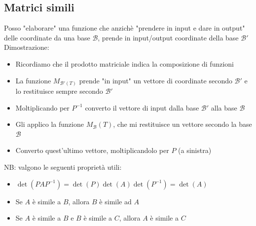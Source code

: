 \documentclass[12pt,a4paper,oneside]{article}
\begin{document}
\subsection{Matrici simili}
Posso "elaborare" una funzione che anzichè "prendere in input e dare in output" delle coordinate da una base $ \mathcal{B} $, prende in input/output coordinate della base $ \mathcal{B}' $
Dimostrazione:
\begin{itemize}
	\item Ricordiamo che il prodotto matriciale indica la composizione di funzioni
	\item La funzione $ M_{\mathcal{B}'\left( T \right) } $ prende "in input" un vettore di coordinate secondo $ \mathcal{B}' $ e lo restituisce sempre secondo $ \mathcal{B}' $
	\item Moltiplicando per $ P^{-1} $ converto il vettore di input dalla base $ \mathcal{B}' $ alla base $ \mathcal{B} $
	\item Gli applico la funzione $ M_{\mathcal{B}}\left( T \right)  $, che mi restituisce un vettore secondo la base $ \mathcal{B} $
	\item Converto quest'ultimo vettore, moltiplicandolo per $ P $ (a sinistra)
\end{itemize}
NB: valgono le seguenti proprietà utili:
\begin{itemize}
	\item $ \det \left( PAP^{-1} \right) = \det \left( P \right) \det \left( A \right) \det \left( P^{-1} \right) = \det  \left( A \right)  $
	\item Se $ A $ è simile a $ B $, allora $ B $ è simile ad $ A $
	\item Se $ A $ è simile a $ B $ e $ B $ è simile a $ C $, allora $ A $ è simile a $ C $
\end{itemize}
\end{document}
